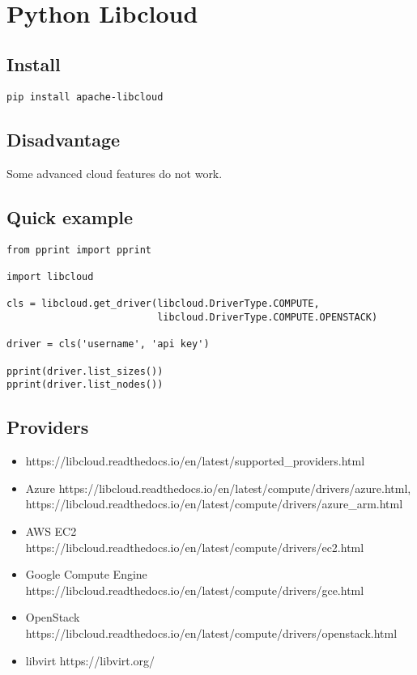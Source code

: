 \MDNAME\

\section{Python Libcloud}


\subsection{Install}

\begin{lstlisting}
pip install apache-libcloud
\end{lstlisting}

\subsection{Disadvantage}

Some advanced cloud features do not work.

\subsection{Quick example}

\begin{lstlisting}
from pprint import pprint

import libcloud

cls = libcloud.get_driver(libcloud.DriverType.COMPUTE,
                          libcloud.DriverType.COMPUTE.OPENSTACK)

driver = cls('username', 'api key')

pprint(driver.list_sizes())
pprint(driver.list_nodes())
\end{lstlisting}

\subsection{Providers}

\begin{itemize}
\item
  https://libcloud.readthedocs.io/en/latest/supported\_providers.html
\item
  Azure
  https://libcloud.readthedocs.io/en/latest/compute/drivers/azure.html,
  https://libcloud.readthedocs.io/en/latest/compute/drivers/azure\_arm.html
\item
  AWS EC2
  https://libcloud.readthedocs.io/en/latest/compute/drivers/ec2.html
\item
  Google Compute Engine
  https://libcloud.readthedocs.io/en/latest/compute/drivers/gce.html
\item
  OpenStack
  https://libcloud.readthedocs.io/en/latest/compute/drivers/openstack.html
\item
  libvirt https://libvirt.org/
\end{itemize}

